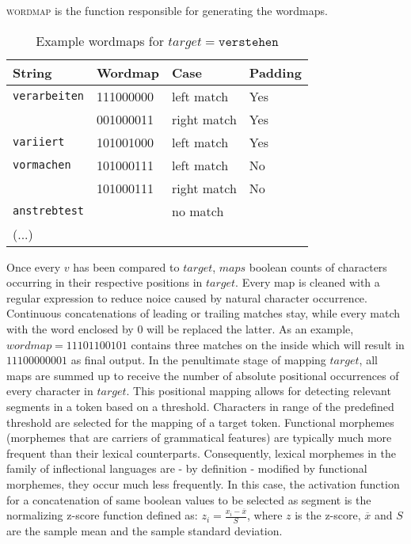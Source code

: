 \textsc{wordmap} is the function responsible for generating the wordmaps.


\begin{table}
    \centering
    \begin{tabular}{llll}
        \toprule
        \textbf{String} & \textbf{Wordmap} & \textbf{Case} & \textbf{Padding} \\
        \midrule
        \texttt{verarbeiten} & 111000000 & left match & Yes \\
         & 001000011 & right match & Yes \\
        \texttt{variiert} & 101001000 & left match & Yes \\
        \texttt{vormachen} & 101000111 & left match & No \\
        & 101000111 & right match & No \\
        \texttt{anstrebtest} &  & no match &   \\
        (...) &  &  &  \\
        \bottomrule
    \end{tabular}
    \caption{Example wordmaps for $target = \texttt{verstehen}$}
    \label{tab:}
\end{table}

Once every $v$ has been compared to $target$, $maps$ boolean counts of characters occurring in their respective positions in $target$.
Every map is cleaned with a regular expression to reduce noice caused by natural character occurrence.
Continuous concatenations of leading or trailing matches stay, while every match with the word enclosed by $0$ will be replaced the latter.
As an example, $wordmap = 11101100101$ contains three matches on the inside which will result in $11100000001$ as final output.
In the penultimate stage of mapping $target$, all maps are summed up to receive the number of absolute positional occurrences of every character in $target$.
This positional mapping allows for detecting relevant segments in a token based on a threshold.
Characters in range of the predefined threshold are selected for the mapping of a target token.
Functional morphemes (morphemes that are carriers of grammatical features) are typically much more frequent than their lexical counterparts.
Consequently, lexical morphemes in the family of inflectional languages are - by definition - modified by functional morphemes, they occur much less frequently.
In this case, the activation function for a concatenation of same boolean values to be selected as segment is the normalizing z-score function defined as: $z_{i} = \frac{x_{i} - \overline{x}}{S}$,
where $z$ is the z-score, $\overline{x}$ and $S$ are the sample mean and the sample standard deviation.


